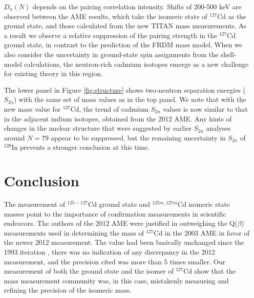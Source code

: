 \documentclass[twocolumn,prc,showpacs,preprintnumbers,amsmath,amssymb,superscriptaddress,nofootinbib,aps,10pt]{revtex4-1}
\begin{document}
$D_n(N)$ depends on the pairing correlation intensity. Shifts of 200-500 keV are observed between the AME results, which take the isomeric state of $^{127}$Cd as the ground state, and those calculated from the new TITAN mass measurements. As a result we observe a relative suppression of the pairing strength in the $^{127}$Cd ground state, in contrast to the prediction of the FRDM mass model. When we also consider the uncertainty in ground-state spin assignments from the shell-model calculations, the neutron-rich cadmium isotopes emerge as a new challenge for existing theory in this region.


The lower panel in Figure \ref{fig:structure} shows two-neutron separation energies ($S_{2n}$) with the same set of mass values as in the top panel. We note that with the new mass value for $^{127}$Cd, the trend of cadmium $S_{2n}$ values is now similar to that in the adjacent indium isotopes, obtained from the 2012 AME. Any hints of changes in the nuclear structure that were suggested by earlier $S_{2n}$ analyses around $N=79$ appear to be suppressed, but the remaining uncertainty in $S_{2n}$ of $^{128}$In prevents a stronger conclusion at this time.

\section{Conclusion}

The measurement of $^{125-127}$Cd ground state and $^{125m,127m}$Cd isomeric state masses point to the importance of confirmation measurements in scientific endeavors. The authors of the 2012 AME were justified in outweighing the Q($\beta$) measurements used in determining the mass of $^{127}$Cd in the 2003 AME in favor of the newer 2012 measurement. The value had been basically unchanged since the 1993 iteration \cite{Audi1993}, there was no indication of any discrepancy in the 2012 measurement, and the precision cited was more than 5 times smaller. Our measurement of both the ground state and the isomer of $^{127}$Cd show that the mass measurement community was, in this case, mistakenly measuring and refining the precision of the isomeric mass.
\end{document}
